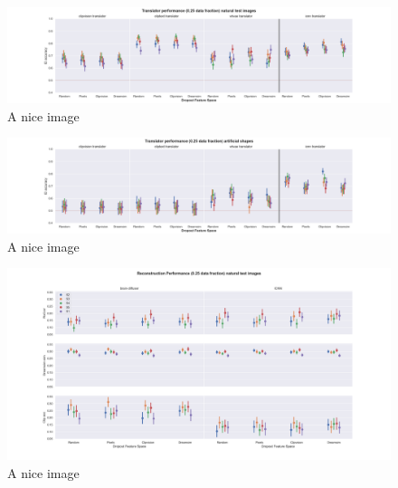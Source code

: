 



\begin{figure}[ht]
    \centering
    \includegraphics[width=1\textwidth]{plots/dropout_eval_translator_test.png}
    \caption{A nice image}\label{fig:dropout_eval_translator_test}
\end{figure}

\begin{figure}[ht]
    \centering
    \includegraphics[width=1\textwidth]{plots/dropout_eval_translator_art.png}
    \caption{A nice image}\label{fig:dropout_eval_translator_art}
\end{figure}


\begin{figure}[ht]
    \centering
    \includegraphics[width=1\textwidth]{plots/dropout_eval_reconstruction_test.png}
    \caption{A nice image}\label{fig:dropout_eval_reconstruction_test}
\end{figure}


